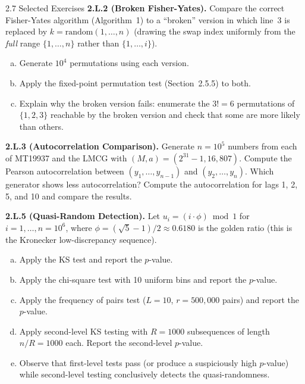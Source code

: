 \documentclass[aspectratio=169,10pt]{beamer}
\begin{document}
\begin{frame}[allowframebreaks]{2.7 Selected Exercises}
\textbf{2.L.2 (Broken Fisher-Yates).}
Compare the correct Fisher-Yates algorithm (Algorithm~1) to a ``broken''
version in which line~3 is replaced by $k = \mathrm{random}(1, \ldots, n)$
(drawing the swap index uniformly from the \emph{full} range $\{1,\ldots,n\}$
rather than $\{1,\ldots,i\}$).
\begin{enumerate}[(a)]
  \item Generate $10^4$ permutations using each version.
  \item Apply the fixed-point permutation test (Section~2.5.5) to both.
  \item Explain why the broken version fails: enumerate the $3! = 6$
    permutations of $\{1,2,3\}$ reachable by the broken version and check
    that some are more likely than others.
\end{enumerate}

\textbf{2.L.3 (Autocorrelation Comparison).}
Generate $n = 10^5$ numbers from each of MT19937 and the LMCG with
$(M, a) = (2^{31}-1, 16{,}807)$.  Compute the Pearson autocorrelation
between $(y_1, \ldots, y_{n-1})$ and $(y_2, \ldots, y_n)$.  Which generator
shows less autocorrelation?  Compute the autocorrelation for lags 1, 2, 5,
and 10 and compare the results.

\textbf{2.L.5 (Quasi-Random Detection).}
Let $u_i = (i \cdot \phi) \bmod 1$ for $i = 1, \ldots, n = 10^6$, where
$\phi = (\sqrt{5}-1)/2 \approx 0.6180$ is the golden ratio (this is the
Kronecker low-discrepancy sequence).
\begin{enumerate}[(a)]
  \item Apply the KS test and report the $p$-value.
  \item Apply the chi-square test with 10 uniform bins and report the $p$-value.
  \item Apply the frequency of pairs test ($L = 10$, $r = 500{,}000$ pairs)
    and report the $p$-value.
  \item Apply second-level KS testing with $R = 1000$ subsequences of length
    $n/R = 1000$ each.  Report the second-level $p$-value.
  \item Observe that first-level tests pass (or produce a suspiciously high
    $p$-value) while second-level testing conclusively detects the
    quasi-randomness.
\end{enumerate}

\end{frame}
\end{document}
